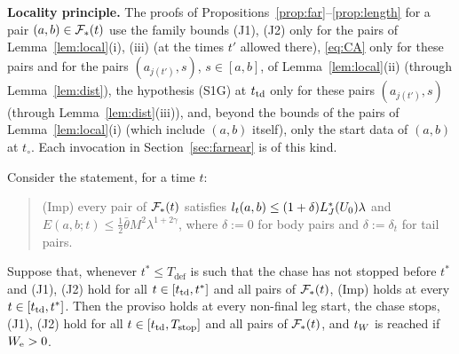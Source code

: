 \noindent\textbf{Locality principle.} The proofs of Propositions~\ref{prop:far}--\ref{prop:length} for a pair $(a,b)\in\mathcal F_*(t)$
use the family bounds (J1), (J2) only for the pairs of Lemma~\ref{lem:local}(i), (iii) (at the times $t'$ allowed there),
\eqref{eq:CA} only for these pairs and for the pairs $(a_{j(t')},s)$, $s\in[a,b]$, of Lemma~\ref{lem:local}(ii) (through
Lemma~\ref{lem:dist}), the hypothesis (S1G) at $t_{\mathrm{td}}$ only for these pairs $(a_{j(t')},s)$ (through Lemma~\ref{lem:dist}(iii)),
and, beyond the bounds of the pairs of Lemma~\ref{lem:local}(i) (which include $(a,b)$ itself), only the start data of $(a,b)$ at
$t_\circ$. Each invocation in Section~\ref{sec:farnear} is of this kind.

\begin{lemma}\label{lem:cont}
Consider the statement, for a time $t$:
\begin{quote}
\textup{(Imp)} every pair of $\mathcal F_*(t)$ satisfies $l_t(a,b)\le(1+\delta)L^*_J(U_0)\lambda$ and
$E(a,b;t)\le\frac12\bar\theta M^2\lambda^{1+2\gamma}$, where $\delta:=0$ for body pairs and $\delta:=\delta_t$ for tail pairs.
\end{quote}
Suppose that, whenever $t^*\le T_{\mathrm{def}}$ is such that the chase has not stopped before $t^*$ and \textup{(J1)}, \textup{(J2)}
hold for all $t\in[t_{\mathrm{td}},t^*]$ and all pairs of $\mathcal F_*(t)$, \textup{(Imp)} holds at every $t\in[t_{\mathrm{td}},t^*]$. Then the proviso holds
at every non-final leg start, the chase stops, \textup{(J1)}, \textup{(J2)} hold for all $t\in[t_{\mathrm{td}},T_{\mathrm{stop}}]$ and all pairs of
$\mathcal F_*(t)$, and $t_W$ is reached if $W_{\mathrm e}>0$.
\end{lemma}

